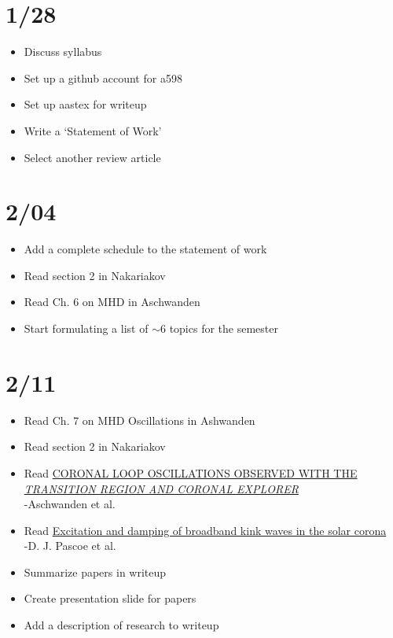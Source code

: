 \documentclass[12pt]{article}
\begin{document}
\newpage
\section*{1/28}
\vspace{-0.5cm}
\begin{itemize}
    \item Discuss syllabus
    \item Set up a github account for a598
    \item Set up aastex for writeup
    \item Write a `Statement of Work'
    \item Select another review article
\end{itemize}

\section*{2/04}
\vspace{-0.5cm}
\begin{itemize}
    \item Add a complete schedule to the statement of work
    \item Read section 2 in Nakariakov
    \item Read Ch. 6 on MHD in Aschwanden
    \item Start formulating a list of $\sim$6 topics
            for the semester
\end{itemize}

\section*{2/11}
\vspace{-0.5cm}
\begin{itemize}
    \item Read Ch. 7 on MHD Oscillations in Ashwanden
    \item Read section 2 in Nakariakov
    \item Read 
        \href{http://cdsads.u-strasbg.fr/abs/2015A\%26A...578A..99P}
        {\textcolor{cobalt}{CORONAL LOOP OSCILLATIONS OBSERVED WITH THE
        \emph{TRANSITION REGION AND CORONAL EXPLORER}}}
        \\-Aschwanden et al.
    \item Read
        \href{http://iopscience.iop.org/article/10.1086/307502/meta}
        {\textcolor{cobalt}{Excitation and damping of broadband
        kink waves in the solar corona}}\\-D. J. Pascoe et al.
    \item Summarize papers in writeup
    \item Create presentation slide for papers
    \item Add a description of research to writeup
\end{itemize}
\end{document}
